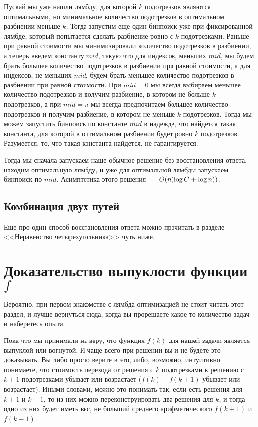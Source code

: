 Пускай мы уже нашли лямбду, для которой $k$ подотрезков являются оптимальными, но минимальное количество подотрезков в оптимальном разбиении меньше $k$. Тогда запустим еще один бинпоиск уже при фиксированной лямбде, который попытается сделать разбиение ровно с $k$ подотрезками. Раньше при равной стоимости мы минимизировали количество подотрезков в разбиении, а теперь введем константу $mid$, такую что для индексов, меньших $mid$, мы будем брать большее количество подотрезков в разбиении при равной стоимости, а для индексов, не меньших $mid$, будем брать меньшее количество подотрезков в разбиении при равной стоимости. При $mid = 0$ мы всегда выбираем меньшее количество подотрезков и получим разбиение, в котором не больше $k$ подотрезков, а при $mid = n$ мы всегда предпочитаем большее количество подотрезков и получим разбиение, в котором не меньше $k$ подотрезков. Тогда мы можем запустить бинпоиск по константе $mid$ в надежде, что найдется такая константа, для которой в оптимальном разбиении будет ровно $k$ подотрезков. Разумеется, то, что такая константа найдется, не гарантируется.

Тогда мы сначала запускаем наше обычное решение без восстановления ответа, находим оптимальную лямбду, и уже для оптимальной лямбды запускаем бинпоиск по $mid$. Асимптотика этого решения~--- $O(n (\log C + \log n))$.

\subsection{Комбинация двух путей}

Еще про один способ восстановления ответа можно прочитать в разделе <<Неравенство четырехугольника>> чуть ниже.

\section{Доказательство выпуклости функции $f$}

Вероятно, при первом знакомстве с лямбда-оптимизацией не стоит читать этот раздел, и лучше вернуться сюда, когда вы прорешаете какое-то количество задач и наберетесь опыта.

Пока что мы принимали на веру, что функция $f(k)$ для нашей задачи является выпуклой или вогнутой. И чаще всего при решении вы и не будете это доказывать. Вы либо просто верите в это, либо, возможно, интуитивно понимаете, что стоимость перехода от решения с $k$ подотрезками к решению с $k + 1$ подотрезками убывает или возрастает ($f(k) - f(k + 1)$ убывает или возрастает). Иными словами, можно это понимать так: если есть решения для $k + 1$ и $k - 1$, то из них можно переконструировать два решения для $k$, и тогда одно из них будет иметь вес, не больший среднего арифметического $f(k + 1)$ и $f(k - 1)$.

